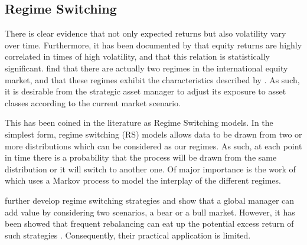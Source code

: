 \subsection{Regime Switching}

There is clear evidence that not only expected returns but also volatility vary over time. Furthermore, it has been documented by \citet{longin1999correlation} that equity returns are highly correlated in times of high volatility, and that this relation is statistically significant. \citet{Ang2002InternationalAA} find that there are actually two regimes in the international equity market, and that these regimes exhibit the characteristics described by \citet{longin1999correlation}. As such, it is desirable from the strategic asset manager to adjust its exposure to asset classes according to the current market scenario. 

This has been coined in the literature as Regime Switching models. In the simplest form, regime switching (RS) models allows data to be drawn from two or more distributions which can be considered as our regimes. As such, at each point in time there is a probability that the process will be drawn from the same distribution or it will switch to another one. Of major importance is the work of \citet{hamilton1989new} which uses a Markov process to model the interplay of the different regimes.

\citet{ang2004regimes} further develop regime switching strategies and show that a global manager can add value by considering two scenarios, a bear or a bull market. However, it has been showed that frequent rebalancing can eat up the potential excess return of such strategies \citep{bauer2004timing}. Consequently, their practical application is limited.